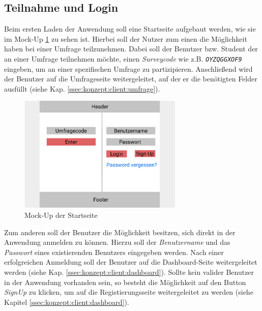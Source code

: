 \subsection{Teilnahme und Login}

Beim ersten Laden der Anwendung soll eine Startseite aufgebaut werden, wie sie im Mock-Up \ref{fig:MockSignin} zu sehen ist. 
Hierbei soll der Nutzer zum einen die Möglichkeit haben bei einer Umfrage teilzunehmen. 
Dabei soll der Benutzer bzw. Student der an einer Umfrage teilnehmen möchte, einen \emph{Surveycode} wie z.B. \emph{\texttt{OYZQGGXOF9}} eingeben, um an einer spezifischen Umfrage zu partizipieren. 
Anschließend wird der Benutzer auf die Umfrageseite weitergeleitet, auf der er die benötigten Felder ausfüllt (siehe Kap. \ref{ssec:konzept:client:umfrage}).

\begin{figure}[h]
	\centering
	\includegraphics[width=0.7\textwidth]{img/konzeption/client/signin}
	\captionsetup{justification=centering, format=plain}
	\caption[Mock-Up der Startseite]{Mock-Up der Startseite \\\figma}
	\label{fig:MockSignin}
\end{figure}

Zum anderen soll der Benutzer die Möglichkeit besitzen, sich direkt in der Anwendung anmelden zu können.
Hierzu soll der \emph{Benutzername} und das \emph{Passwort} eines existierenden Benutzers eingegeben werden. 
Nach einer erfolgreichen Anmeldung soll der Benutzer auf die Dashboard-Seite weitergeleitet werden (siehe Kap. \ref{ssec:konzept:client:dashboard}).
Sollte kein valider Benutzer in der Anwendung vorhanden sein, so besteht die Möglichkeit auf den Button \emph{SignUp} zu klicken, um auf die Registierungsseite weitergeleitet zu werden (siehe Kapitel \ref{ssec:konzept:client:dashboard}).

